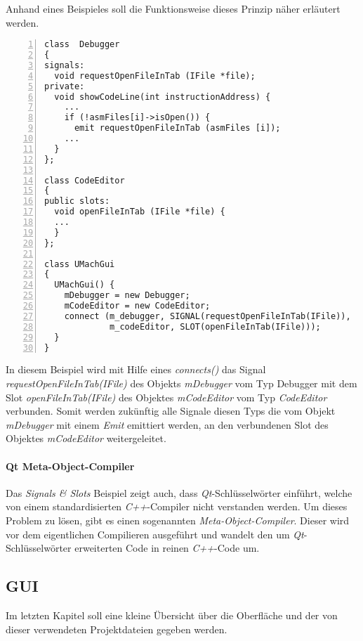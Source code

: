 Anhand eines Beispieles soll die Funktionsweise dieses Prinzip näher erläutert werden.

\begin{lstlisting}[numbers=left, numberstyle=\tiny]
class  Debugger
{
signals:
  void requestOpenFileInTab (IFile *file);
private:
  void showCodeLine(int instructionAddress) {
    ...
    if (!asmFiles[i]->isOpen()) {
      emit requestOpenFileInTab (asmFiles [i]);
    ...
  }
};

class CodeEditor
{
public slots:
  void openFileInTab (IFile *file) {
  ...
  }
};	

class UMachGui
{
  UMachGui() {  	
    mDebugger = new Debugger;
    mCodeEditor = new CodeEditor;
    connect (m_debugger, SIGNAL(requestOpenFileInTab(IFile)),
             m_codeEditor, SLOT(openFileInTab(IFile)));  
  }
}
\end{lstlisting}

In diesem Beispiel wird mit Hilfe eines \emph{connects()} das Signal \emph{requestOpenFileInTab(IFile)} des Objekts \emph{mDebugger} vom Typ Debugger mit dem Slot \emph{openFileInTab(IFile)} des Objektes \emph{mCodeEditor} vom Typ \emph{CodeEditor} verbunden. Somit werden zukünftig alle Signale diesen Typs die vom Objekt \emph{mDebugger} mit einem \emph{Emit} emittiert werden, an den verbundenen Slot des Objektes \emph{mCodeEditor} weitergeleitet.

\paragraph{Qt Meta-Object-Compiler}
Das \emph{Signals \& Slots }Beispiel zeigt auch, dass \emph{Qt}-Schlüsselwörter einführt, welche von einem standardisierten \emph{C++}-Compiler nicht verstanden werden. Um dieses Problem zu lösen, gibt es einen sogenannten \emph{Meta-Object-Compiler}. Dieser wird vor dem eigentlichen Compilieren ausgeführt und wandelt den um \emph{Qt}-Schlüsselwörter erweiterten Code in reinen \emph{C++}-Code um.

\subsection{GUI}

Im letzten Kapitel soll eine kleine Übersicht über die Oberfläche und der von dieser verwendeten Projektdateien gegeben werden.

